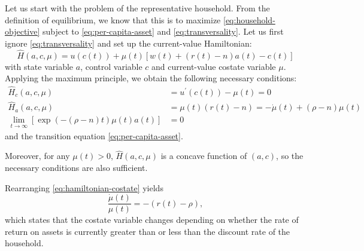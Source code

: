\documentclass[\topdir/lecture\_notes.tex]{subfiles}
\begin{document}
Let us start with the problem of the representative household.
From the definition of equilibrium, we know that this is to maximize \eqref{eq:household-objective} subject to \eqref{eq:per-capita-asset} and \eqref{eq:transversality}.
Let us first ignore \eqref{eq:transversality} and set up the current-value Hamiltonian:
\[
  \hat{H}(a, c, \mu)=u(c(t))+\mu(t)[w(t)+(r(t)-n) a(t)-c(t)]
\]
with state variable $a$, control variable $c$ and current-value costate variable $\mu$.
Applying the maximum principle, we obtain the following necessary conditions:
\begin{align}
  \hat{H}_{c}(a, c, \mu)                                      & =u^{\prime}(c(t))-\mu(t)=0                    &  & \label{eq:hamiltonian-foc-c}          \\
  \hat{H}_{a}(a, c, \mu)                                      & =\mu(t)(r(t)-n)=-\dot{\mu}(t)+(\rho-n) \mu(t) &  & \label{eq:hamiltonian-costate}        \\
  \lim _{t \rightarrow \infty}[\exp(-(\rho-n) t) \mu(t) a(t)] & =0                                            &  & \nonumber
\end{align}
and the transition equation \eqref{eq:per-capita-asset}.

Moreover, for any $\mu(t)>0$, $\hat{H}(a, c, \mu)$ is a concave function of $(a, c)$, so the necessary conditions are also sufficient.

Rearranging \eqref{eq:hamiltonian-costate} yields
\begin{equation}
  \frac{\dot{\mu}(t)}{\mu(t)}=-(r(t)-\rho),
  \label{eq:mu-dynamics}
\end{equation}
which states that the costate variable changes depending on whether the rate of return on assets is currently greater than or less than the discount rate of the household.
\end{document}
